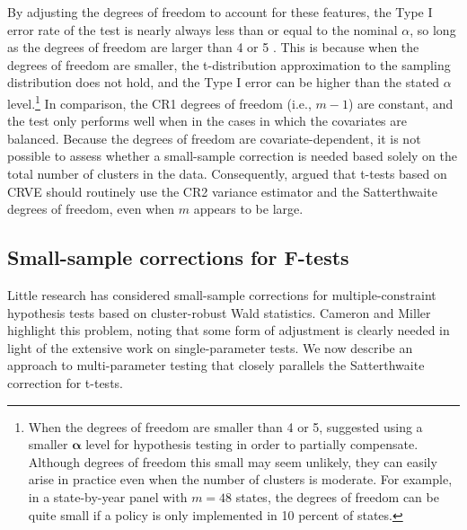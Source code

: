 \documentclass[12pt]{article}\usepackage[]{graphicx}\usepackage[]{color}
\newcommand{\bs}{\boldsymbol}
\begin{document}
By adjusting the degrees of freedom to account for these features, the Type I error rate of the test is nearly always less than or equal to the nominal $\alpha$, so long as the degrees of freedom are larger than 4 or 5 \citep{Bell2002bias, Tipton2015small-t}.
This is because when the degrees of freedom are smaller, the t-distribution approximation to the sampling distribution does not hold, and the Type I error can be higher than the stated $\alpha$ level.\footnote{When the degrees of freedom are smaller than 4 or 5, \citet{Tipton2015small-t} suggested using a smaller $\bs\alpha$ level for hypothesis testing in order to partially compensate. 
Although degrees of freedom this small may seem unlikely, they can easily arise in practice even when the number of clusters is moderate. For example, in a state-by-year panel with $m = 48$ states, the degrees of freedom can be quite small if a policy is only implemented in 10 percent of states.}
In comparison, the CR1 degrees of freedom (i.e., $m - 1$) are constant, and the test only performs well when in the cases in which the covariates are balanced.
Because the degrees of freedom are covariate-dependent, it is not possible to assess whether a small-sample correction is needed based solely on the total number of clusters in the data. 
Consequently, \citet{Tipton2015small-t} argued that t-tests based on CRVE should routinely use the CR2 variance estimator and the Satterthwaite degrees of freedom, even when $m$ appears to be large.


\subsection{Small-sample corrections for F-tests}
\label{subsec:F-tests}

Little research has considered small-sample corrections for multiple-constraint hypothesis tests based on cluster-robust Wald statistics.
Cameron and Miller highlight this problem, noting that some form of adjustment is clearly needed in light of the extensive work on single-parameter tests.
We now describe an approach to multi-parameter testing that closely parallels the Satterthwaite correction for t-tests.
\end{document}
